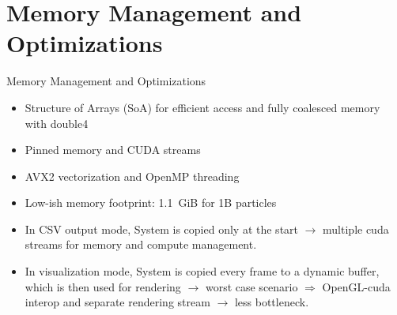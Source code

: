 \documentclass{beamer}
\begin{document}
\section{Memory Management and Optimizations}
\begin{frame}{Memory Management and Optimizations}
    \begin{itemize}
        \item Structure of Arrays (SoA) for efficient access and fully coalesced memory with double4
        \item Pinned memory and CUDA streams
        \item AVX2 vectorization and OpenMP threading
        \item Low-ish memory footprint: \SI{1.1}{GiB} for 1B particles
        \item In CSV output mode, System is copied only at the start $\rightarrow$ multiple cuda streams for memory and compute management.
        \item In visualization mode, System is copied every frame to a dynamic buffer, which is then used for rendering
                $\rightarrow$ worst case scenario $\Rightarrow$ OpenGL-cuda interop and separate rendering stream $\rightarrow$ less bottleneck.
    \end{itemize}
\end{frame}
\end{document}

